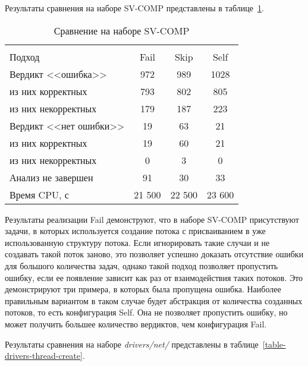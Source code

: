 Результаты сравнения на наборе SV-COMP представлены в таблице~\ref{table-svcomp-thread-create}.

  \begin{table}[h]\footnotesize \centering
    \caption{Сравнение на наборе SV-COMP}
  	\label{table-svcomp-thread-create}
    \begin{tabular}{ | l | c | c | c |}
      \hline
      		& 		\multicolumn{3}{c|}{\theory}  \\
      Подход         				& Fail 	& Skip 	& Self  	\\ \hline
      Вердикт <<ошибка>> 			& 972   & 989   & 1028       \\ 
  \hspace{0.5cm} из них корректных 	& 793 	& 802 	& 805    	\\ 
  \hspace{0.5cm} из них некорректных & 179 	& 187 	& 223     	\\ \hline
      Вердикт <<нет ошибки>>  		& 19    & 63    & 21       	\\ 
  \hspace{0.5cm} из них корректных 	& 19 	& 60    & 21      	\\
  \hspace{0.5cm} из них некорректных & 0 	& 3    	& 0     	\\ \hline
      Анализ не завершен       		& 91    & 30    & 33    	\\ \hline
      Время CPU, с   				& 21 500 & 22 500 & 23 600  \\ 
      \hline
    \end{tabular}
  \end{table}

Результаты реализации Fail демонструют, что в наборе SV-COMP присутствуют задачи, в которых используется создание потока с присваиванием в уже использованную структуру потока. 
Если игнорировать такие случаи и не создавать такой поток заново, это позволяет успешно доказать отсутствие ошибки для большого количества задач, однако такой подход позволяет пропустить ошибку, если ее появление зависит как раз от взаимодействия таких потоков.
Это демонстрируют три примера, в которых была пропущена ошибка.
Наиболее правильным вариантом в таком случае будет абстракция от количества созданных потоков, то есть конфигурация Self. 
Она не позволяет пропустить ошибку, но может получить большее количество вердиктов, чем конфигурация Fail.

Результаты сравнения на наборе \textit{drivers/net/} представлены в таблице~\ref{table-drivers-thread-create}.

